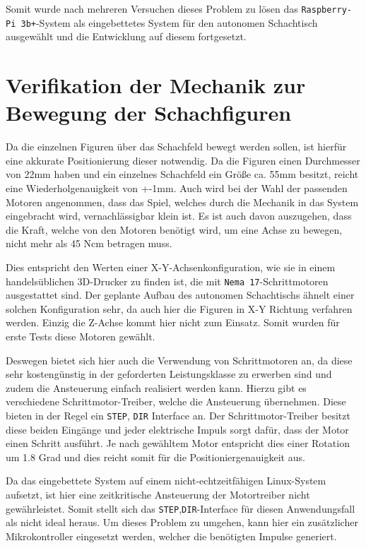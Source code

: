 Somit wurde nach mehreren Versuchen dieses Problem zu lösen das
\passthrough{\lstinline!Raspberry-Pi 3b+!}-System als eingebettetes
System für den autonomen Schachtisch ausgewählt und die Entwicklung auf
diesem fortgesetzt.

\hypertarget{verifikation-der-mechanik-zur-bewegung-der-schachfiguren}{%
\section{Verifikation der Mechanik zur Bewegung der
Schachfiguren}\label{verifikation-der-mechanik-zur-bewegung-der-schachfiguren}}

Da die einzelnen Figuren über das Schachfeld bewegt werden sollen, ist
hierfür eine akkurate Positionierung dieser notwendig. Da die Figuren
einen Durchmesser von 22mm haben und ein einzelnes Schachfeld ein Größe
ca. 55mm besitzt, reicht eine Wiederholgenauigkeit von +-1mm. Auch wird
bei der Wahl der passenden Motoren angenommen, dass das Spiel, welches
durch die Mechanik in das System eingebracht wird, vernachlässigbar
klein ist. Es ist auch davon auszugehen, dass die Kraft, welche von den
Motoren benötigt wird, um eine Achse zu bewegen, nicht mehr als 45 Ncm
betragen muss.

Dies entspricht den Werten einer X-Y-Achsenkonfiguration, wie sie in
einem handelsüblichen 3D-Drucker zu finden ist, die mit
\passthrough{\lstinline!Nema 17!}-Schrittmotoren ausgestattet sind. Der
geplante Aufbau des autonomen Schachtischs ähnelt einer solchen
Konfiguration sehr, da auch hier die Figuren in X-Y Richtung verfahren
werden. Einzig die Z-Achse kommt hier nicht zum Einsatz. Somit wurden
für erste Tests diese Motoren gewählt.

Deswegen bietet sich hier auch die Verwendung von Schrittmotoren an, da
diese sehr kostengünstig in der geforderten Leistungsklasse zu erwerben
sind und zudem die Ansteuerung einfach realisiert werden kann. Hierzu
gibt es verschiedene Schrittmotor-Treiber, welche die Ansteuerung
übernehmen. Diese bieten in der Regel ein
\passthrough{\lstinline!STEP!}, \passthrough{\lstinline!DIR!} Interface
an. Der Schrittmotor-Treiber besitzt diese beiden Eingänge und jeder
elektrische Impuls sorgt dafür, dass der Motor einen Schritt ausführt.
Je nach gewähltem Motor entspricht dies einer Rotation um 1.8 Grad und
dies reicht somit für die Positioniergenauigkeit aus.

Da das eingebettete System auf einem nicht-echtzeitfähigen Linux-System
aufsetzt, ist hier eine zeitkritische Ansteuerung der Motortreiber nicht
gewährleistet. Somit stellt sich das
\passthrough{\lstinline!STEP!},\passthrough{\lstinline!DIR!}-Interface
für diesen Anwendungsfall als nicht ideal heraus. Um dieses Problem zu
umgehen, kann hier ein zusätzlicher Mikrokontroller eingesetzt werden,
welcher die benötigten Impulse generiert.

